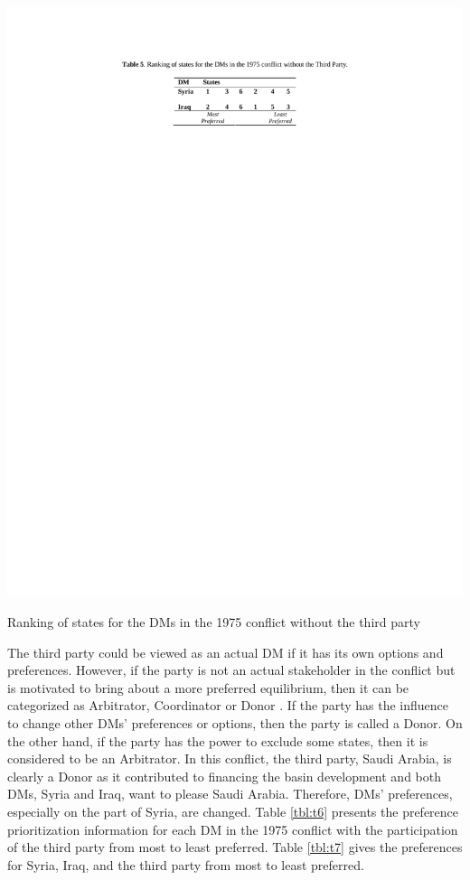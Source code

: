 \documentclass[letterpaper,12pt,titlepage,oneside,final]{book}
\begin{document}
\begin{table}[H]
\centering
\includegraphics[scale=1]{PDF-IMG/tables/5.pdf}

\caption{Ranking of states for the DMs in the 1975 conflict without the third party}

\label{tbl:t5}
\end{table}

The third party could be viewed as an actual DM if it has its own options and preferences. However, if the party is not an actual stakeholder in the conflict but is motivated to bring about a more preferred equilibrium, then it can be categorized as Arbitrator, Coordinator or Donor \citep{sakamoto2005}. If the party has the influence to change other DMs' preferences or options, then the party is called a Donor. On the other hand, if the party has the power to exclude some states, then it is considered to be an Arbitrator. In this conflict, the third party, Saudi Arabia, is clearly a Donor as it contributed to financing the basin development and both DMs, Syria and Iraq, want to please Saudi Arabia. Therefore, DMs' preferences, especially on the part of Syria, are changed. Table \ref{tbl:t6} presents the preference prioritization information for each DM in the 1975 conflict with the participation of the third party from most to least preferred. Table \ref{tbl:t7} gives the preferences for Syria, Iraq, and the third party from most to least preferred.
\end{document}
